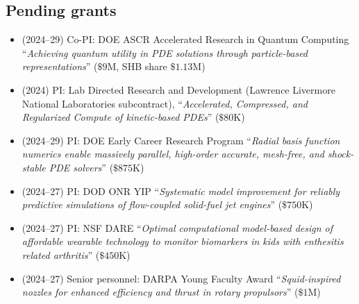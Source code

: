 \subsection{Pending grants}

\begin{itemize}
    \item (2024--29) Co-PI: DOE ASCR Accelerated Research in Quantum Computing ``\textit{Achieving quantum utility in PDE solutions through particle-based representations}'' ($\$9$M, SHB share $\$1.13$M)
    \item (2024) PI: Lab Directed Research and Development (Lawrence Livermore National Laboratories subcontract), ``\textit{Accelerated, Compressed, and Regularized Compute of kinetic-based PDEs}'' ($\$80$K)
    \item (2024--29) PI: DOE Early Career Research Program ``\textit{Radial basis function numerics enable massively parallel, high-order accurate, mesh-free, and shock-stable PDE solvers}'' ($\$875$K)
    \item (2024--27) PI: DOD ONR YIP ``\textit{Systematic model improvement for reliably predictive simulations of flow-coupled solid-fuel jet engines}'' ($\$750$K)
    \item (2024--27) PI: NSF DARE ``\textit{Optimal computational model-based design of affordable wearable technology to monitor biomarkers in kids with enthesitis related arthritis}'' ($\$450$K)
    \item (2024--27) Senior personnel: DARPA Young Faculty Award ``\textit{Squid-inspired nozzles for enhanced  efficiency and thrust in rotary propulsors}'' ($\$1$M)
\end{itemize}
